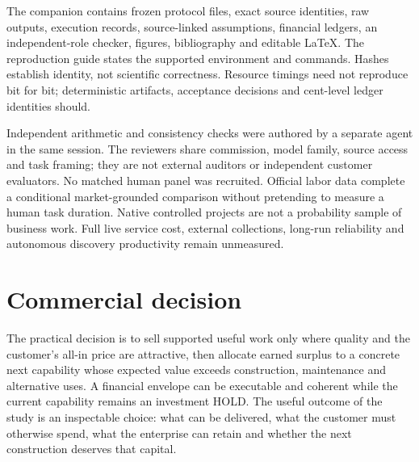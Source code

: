 \documentclass[11pt,a4paper]{article}
\begin{document}
The companion contains frozen protocol files, exact source identities, raw outputs, execution records, source-linked assumptions, financial ledgers, an independent-role checker, figures, bibliography and editable LaTeX. The reproduction guide states the supported environment and commands. Hashes establish identity, not scientific correctness. Resource timings need not reproduce bit for bit; deterministic artifacts, acceptance decisions and cent-level ledger identities should.



Independent arithmetic and consistency checks were authored by a separate agent in the same session. The reviewers share commission, model family, source access and task framing; they are not external auditors or independent customer evaluators. No matched human panel was recruited. Official labor data complete a conditional market-grounded comparison without pretending to measure a human task duration. Native controlled projects are not a probability sample of business work. Full live service cost, external collections, long-run reliability and autonomous discovery productivity remain unmeasured.

\section{Commercial decision}


The practical decision is to sell supported useful work only where quality and the customer's all-in price are attractive, then allocate earned surplus to a concrete next capability whose expected value exceeds construction, maintenance and alternative uses. A financial envelope can be executable and coherent while the current capability remains an investment HOLD. The useful outcome of the study is an inspectable choice: what can be delivered, what the customer must otherwise spend, what the enterprise can retain and whether the next construction deserves that capital.

\clearpage


\appendix
\end{document}
